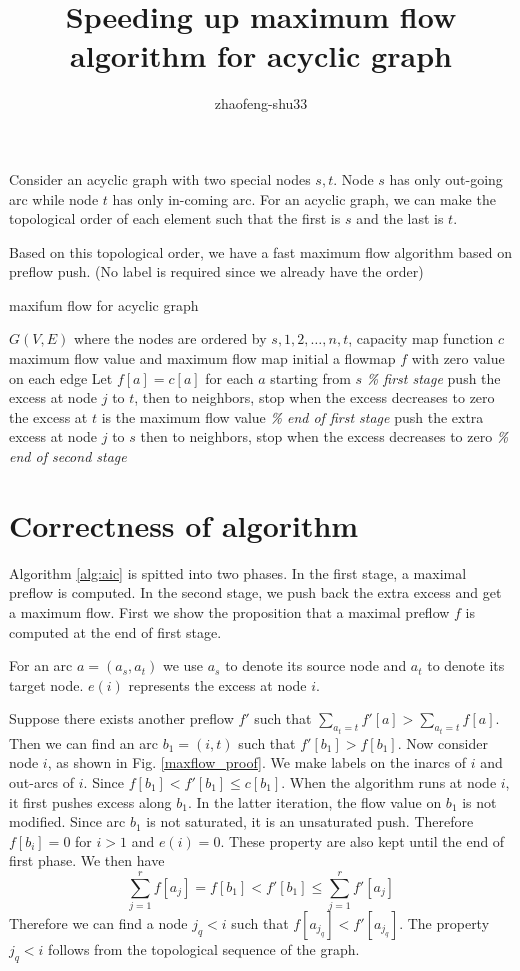 \documentclass{article}
\title{Speeding up maximum flow algorithm for acyclic graph}
\author{zhaofeng-shu33}
\theoremstyle{definition}
\begin{document}
Consider an acyclic graph with two special nodes $s, t$. Node $s$ has only out-going arc while node $t$ has only in-coming arc.
For an acyclic graph, we can make the topological order of each element such that the first is $s$ and the last is $t$.

Based on this topological order, we have a fast maximum flow algorithm based on preflow push. (No label is required since we already have the order)
\begin{algorithm}
\caption{maxifum flow for acyclic graph}\label{alg:aic}
	\begin{algorithmic}[1]
		\REQUIRE $G(V,E)$ where the nodes are ordered by $s, 1, 2, \dots, n, t$, capacity map function $c$
		\ENSURE maximum flow value and maximum flow map
		\STATE initial a flowmap $f$ with zero value on each edge
		\STATE Let $f[a] = c[a]$ for each $a$ starting from $s$  \textit{\% first stage}
			\STATE push the excess at node $j$ to $t$, then to neighbors, stop when the excess decreases to zero
		\ENDFOR
	      \STATE the excess at $t$ is the maximum flow value \textit{\% end of first stage}
			\STATE push the extra excess at node $j$ to $s$ then to neighbors, stop when the excess decreases to zero
		\ENDFOR  \textit{\% end of second stage}
           
	\end{algorithmic}
\end{algorithm}
\section{Correctness of algorithm}
Algorithm \ref{alg:aic} is spitted into two phases. In the first stage, a maximal preflow is computed. In the second stage, we push back the extra excess and get a maximum flow.  
First we show the proposition that a maximal preflow $f$ is computed at the end of first stage.

For an arc $a = (a_s, a_t)$ we use $a_s$ to denote its source node and $a_t$ to denote its target node. $e(i)$ represents the excess at node $i$.

Suppose there exists another preflow $f'$ such that $\sum_{a_t = t} f'[a] > \sum_{a_t =t} f[a]$. Then we can find an arc $b_1 = (i, t)$ such that $f'[b_1] > f[b_1]$. Now consider node $i$, as shown in Fig. \ref{maxflow_proof}. We make labels on the inarcs of $i$ and out-arcs of $i$.
Since $f[b_1] < f'[b_1] \leq c[b_1]$. When the algorithm runs at node $i$, it first pushes excess along $b_1$. In the latter iteration, the flow value on $b_1$ is not modified. Since arc $b_1$ is not saturated, it is an unsaturated push. Therefore $f[b_i] = 0$ for $i>1$ and $e(i) = 0$. These property are also kept until the end of first phase.  We then have
\begin{equation}
\sum_{j=1}^r f[a_j] = f[b_1] < f'[b_1] \leq \sum_{j=1}^r f'[a_j]
\end{equation}
Therefore we can find a node $j_q<i$ such that $f[a_{j_q}] < f'[a_{j_q}]$. The property ${j_q}<i$ follows from the topological sequence of the graph.
\end{document}
